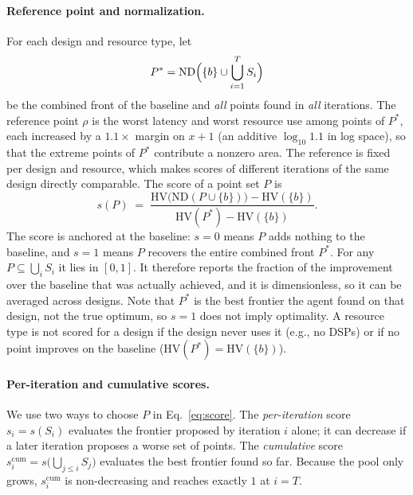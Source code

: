 \paragraph{Reference point and normalization.}
For each design and resource type, let
\begin{equation}
  P^{*} = \mathrm{ND}\Bigl(\{b\} \cup \bigcup_{i=1}^{T} S_i\Bigr)
\end{equation}
be the combined front of the baseline and \emph{all} points found in
\emph{all} iterations. The reference point $\rho$ is the worst latency and worst
resource use among points of $P^{*}$, each increased by a $1.1\times$ margin
on $x+1$ (an additive $\log_{10} 1.1$ in log space), so that the extreme points
of $P^{*}$ contribute a nonzero area. The reference is fixed per design and
resource, which makes scores of different iterations of the same design
directly comparable. The score of a point set $P$ is
\begin{equation}
  s(P) \;=\; \frac{\mathrm{HV}\bigl(\mathrm{ND}(P \cup \{b\})\bigr) - \mathrm{HV}(\{b\})}
                 {\mathrm{HV}(P^{*}) - \mathrm{HV}(\{b\})} .
  \label{eq:score}
\end{equation}
The score is anchored at the baseline: $s = 0$ means $P$ adds nothing to the
baseline, and $s = 1$ means $P$ recovers the entire combined front $P^{*}$. For
any $P \subseteq \bigcup_i S_i$ it lies in $[0, 1]$. It therefore reports the
fraction of the improvement over the baseline that was actually achieved, and
it is dimensionless, so it can be averaged across designs. Note that $P^{*}$ is
the best frontier the agent found on that design, not the true optimum, so
$s = 1$ does not imply optimality. A resource type is not scored for a design if
the design never uses it (e.g., no DSPs) or if no point improves on the
baseline ($\mathrm{HV}(P^{*}) = \mathrm{HV}(\{b\})$).

\paragraph{Per-iteration and cumulative scores.}
We use two ways to choose $P$ in Eq.~\eqref{eq:score}. The
\emph{per-iteration} score $s_i = s(S_i)$ evaluates the frontier proposed by
iteration $i$ alone; it can decrease if a later iteration proposes a worse set
of points. The \emph{cumulative} score $s^{\mathrm{cum}}_i =
s\bigl(\bigcup_{j \le i} S_j\bigr)$ evaluates the best frontier found so far.
Because the pool only grows, $s^{\mathrm{cum}}_i$ is non-decreasing and reaches
exactly $1$ at $i = T$.

